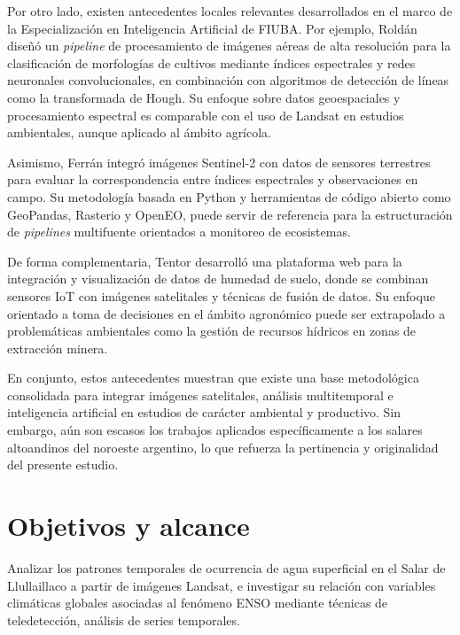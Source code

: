 Por otro lado, existen antecedentes locales relevantes desarrollados en el marco de la Especialización en Inteligencia Artificial de FIUBA. Por ejemplo, Roldán \cite{roldan2023ceia} diseñó un \textit{pipeline} de procesamiento de imágenes aéreas de alta resolución para la clasificación de morfologías de cultivos mediante índices espectrales y redes neuronales convolucionales, en combinación con algoritmos de detección de líneas como la transformada de Hough. Su enfoque sobre datos geoespaciales y procesamiento espectral es comparable con el uso de Landsat en estudios ambientales, aunque aplicado al ámbito agrícola.

Asimismo, Ferrán \cite{ferran2024ceia} integró imágenes Sentinel-2 con datos de sensores terrestres para evaluar la correspondencia entre índices espectrales y observaciones en campo. Su metodología basada en Python y herramientas de código abierto como GeoPandas, Rasterio y OpenEO, puede servir de referencia para la estructuración de \textit{pipelines} multifuente orientados a monitoreo de ecosistemas.

De forma complementaria, Tentor \cite{tentor2023ceiot} desarrolló una plataforma web para la integración y visualización de datos de humedad de suelo, donde se combinan sensores IoT con imágenes satelitales y técnicas de fusión de datos. Su enfoque orientado a toma de decisiones en el ámbito agronómico puede ser extrapolado a problemáticas ambientales como la gestión de recursos hídricos en zonas de extracción minera.

En conjunto, estos antecedentes muestran que existe una base metodológica consolidada para integrar imágenes satelitales, análisis multitemporal e inteligencia artificial en estudios de carácter ambiental y productivo. Sin embargo, aún son escasos los trabajos aplicados específicamente a los salares altoandinos del noroeste argentino, lo que refuerza la pertinencia y originalidad del presente estudio.



\section{Objetivos y alcance}

Analizar los patrones temporales de ocurrencia de agua superficial en el Salar de Llullaillaco a partir de imágenes Landsat, e investigar su relación con variables climáticas globales asociadas al fenómeno ENSO mediante técnicas de teledetección, análisis de series temporales.


